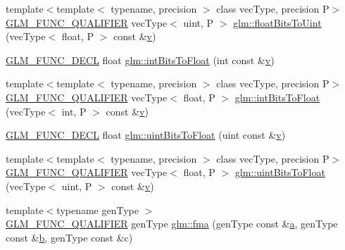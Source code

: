 \begin{DoxyCompactItemize}
\item 
{\footnotesize template$<$template$<$ typename, precision $>$ class vec\+Type, precision P$>$ }\\\mbox{\hyperlink{setup_8hpp_a33fdea6f91c5f834105f7415e2a64407}{G\+L\+M\+\_\+\+F\+U\+N\+C\+\_\+\+Q\+U\+A\+L\+I\+F\+I\+ER}} vec\+Type$<$ uint, P $>$ \mbox{\hyperlink{group__core__func__common_ga1804d4c443605d8a27be644aa461afe4}{glm\+::float\+Bits\+To\+Uint}} (vec\+Type$<$ float, P $>$ const \&\mbox{\hyperlink{glad_8h_a14cfbe2fc2234f5504618905b69d1e06}{v}})
\item 
\mbox{\hyperlink{setup_8hpp_ab2d052de21a70539923e9bcbf6e83a51}{G\+L\+M\+\_\+\+F\+U\+N\+C\+\_\+\+D\+E\+CL}} float \mbox{\hyperlink{group__core__func__common_ga2650dc57b2148a6ffbce20944fb4d97a}{glm\+::int\+Bits\+To\+Float}} (int const \&\mbox{\hyperlink{glad_8h_a14cfbe2fc2234f5504618905b69d1e06}{v}})
\item 
{\footnotesize template$<$template$<$ typename, precision $>$ class vec\+Type, precision P$>$ }\\\mbox{\hyperlink{setup_8hpp_a33fdea6f91c5f834105f7415e2a64407}{G\+L\+M\+\_\+\+F\+U\+N\+C\+\_\+\+Q\+U\+A\+L\+I\+F\+I\+ER}} vec\+Type$<$ float, P $>$ \mbox{\hyperlink{group__core__func__common_gad21ab176dd0e6b59d923db5efca87f4e}{glm\+::int\+Bits\+To\+Float}} (vec\+Type$<$ int, P $>$ const \&\mbox{\hyperlink{glad_8h_a14cfbe2fc2234f5504618905b69d1e06}{v}})
\item 
\mbox{\hyperlink{setup_8hpp_ab2d052de21a70539923e9bcbf6e83a51}{G\+L\+M\+\_\+\+F\+U\+N\+C\+\_\+\+D\+E\+CL}} float \mbox{\hyperlink{group__core__func__common_ga97464ca9ff4267de30ea408f700d4ca8}{glm\+::uint\+Bits\+To\+Float}} (uint const \&\mbox{\hyperlink{glad_8h_a14cfbe2fc2234f5504618905b69d1e06}{v}})
\item 
{\footnotesize template$<$template$<$ typename, precision $>$ class vec\+Type, precision P$>$ }\\\mbox{\hyperlink{setup_8hpp_a33fdea6f91c5f834105f7415e2a64407}{G\+L\+M\+\_\+\+F\+U\+N\+C\+\_\+\+Q\+U\+A\+L\+I\+F\+I\+ER}} vec\+Type$<$ float, P $>$ \mbox{\hyperlink{group__core__func__common_ga3acab37650ecd792dc84548094b58684}{glm\+::uint\+Bits\+To\+Float}} (vec\+Type$<$ uint, P $>$ const \&\mbox{\hyperlink{glad_8h_a14cfbe2fc2234f5504618905b69d1e06}{v}})
\item 
{\footnotesize template$<$typename gen\+Type $>$ }\\\mbox{\hyperlink{setup_8hpp_a33fdea6f91c5f834105f7415e2a64407}{G\+L\+M\+\_\+\+F\+U\+N\+C\+\_\+\+Q\+U\+A\+L\+I\+F\+I\+ER}} gen\+Type \mbox{\hyperlink{group__core__func__common_gad0f444d4b81cc53c3b6edf5aa25078c2}{glm\+::fma}} (gen\+Type const \&\mbox{\hyperlink{glad_8h_ac8729153468b5dcf13f971b21d84d4e5}{a}}, gen\+Type const \&\mbox{\hyperlink{glad_8h_a6eba317e3cf44d6d26c04a5a8f197dcb}{b}}, gen\+Type const \&c)

\end{DoxyCompactItemize}
